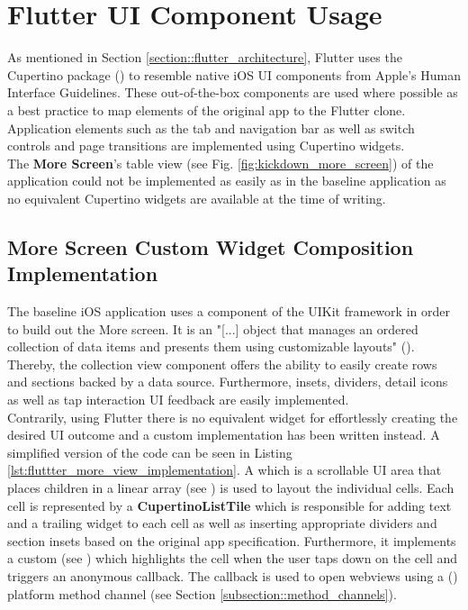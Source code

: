 \section{Flutter UI Component Usage} \label{section::flutter_ui_component_usage}
As mentioned in Section \ref{section::flutter_architecture}, Flutter uses the Cupertino package (\cite{CupertinoPackageDocumentation2021}) to resemble native iOS UI components from Apple's Human Interface Guidelines.
These out-of-the-box components are used where possible as a best practice to map elements of the original app to the Flutter clone. 
Application elements such as the tab and navigation bar as well as switch controls and page transitions are implemented using Cupertino widgets.\\
The \textbf{More Screen}'s table view (see Fig. \ref{fig:kickdown_more_screen}) of the application could not be implemented as easily as in the baseline application as no equivalent Cupertino widgets are available at the time of writing.

\subsection{More Screen Custom Widget Composition Implementation}
The baseline iOS application uses a  component of the UIKit framework in order to build out the More screen.
It is an "[...] object that manages an ordered collection of data items and presents them using customizable layouts" (\cite{UICollectionView2021}).
Thereby, the collection view component offers the ability to easily create rows and sections backed by a data source. 
Furthermore, insets, dividers, detail icons as well as tap interaction UI feedback are easily implemented.\\
Contrarily, using Flutter there is no equivalent widget for effortlessly creating the desired UI outcome and a custom implementation has been written instead.
A simplified version of the code can be seen in Listing \ref{lst:fluttter_more_view_implementation}.
A  which is a scrollable UI area that places children in a linear array (see \cite{SliverList2021}) is used to layout the individual cells.
Each cell is represented by a \textbf{CupertinoListTile} which is responsible for adding text and a trailing widget to each cell as well as inserting appropriate dividers and section insets based on the original app specification.
Furthermore, it implements a custom  (see \cite{GestureDetector2021}) which highlights the cell when the user taps down on the cell and triggers an anonymous callback.
The callback is used to open webviews using a  (\cite{SFSafariViewController2021}) platform method channel (see Section \ref{subsection::method_channels}).


